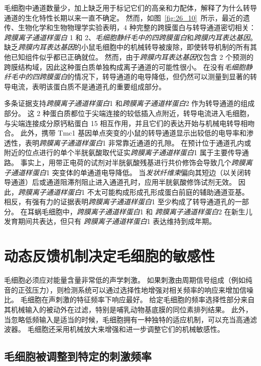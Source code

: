 毛细胞中通道数量少，加上缺乏用于标记它们的高亲和力配体，解释了为什么转导通道的生化特性长期以来一直不确定。
然而，如图~\ref{fig:26_10}~所示，最近的遗传、生物化学和生物物理学实验表明，4 种完整的跨膜蛋白与转导通道密切相关：\textit{跨膜离子通道样蛋白} 1 和 2、\textit{毛细胞静纤毛中的四跨膜蛋白}和\textit{跨膜内耳表达基因}。
缺乏\textit{跨膜内耳表达基因}的小鼠毛细胞中的机械转导被废除，即使转导机制的所有其他已知组件似乎都已正确就位。
然而，由于\textit{跨膜内耳表达基因}仅包含 2 个预测的跨膜结构域，因此这种蛋白质单独构成离子通道的可能性很小。
在没有\textit{毛细胞静纤毛中的四跨膜蛋白}的情况下，转导通道的电导降低，但仍然可以测量到显著的转导电流，表明该蛋白质不是通道孔的重要组成部分。


多条证据支持\textit{跨膜离子通道样蛋白}1 和\textit{跨膜离子通道样蛋白}2 作为转导通道的组成部分。
这 2 种蛋白质都位于尖端连接的较低插入点附近，转导电流进入毛细胞，与尖端连接成分原钙粘蛋白 15 相互作用，并且它们的表达开始与机械电转导相吻合。
此外，携带 Tmc1 基因单点突变的小鼠的转导通道显示出较低的电导率和渗透性，表明\textit{跨膜离子通道样蛋白}1 非常靠近通道的孔隙。
在预计位于通道孔内或附近的位点进行的单个半胱氨酸取代证实\textit{跨膜离子通道样蛋白}1 属于主要传导通路。
事实上，用带正电荷的试剂对半胱氨酸残基进行共价修饰会导致几个\textit{跨膜离子通道样蛋白}1 突变体的单通道电导降低。
当\textit{发状纤维束}偏向其短边（以关闭转导通道）后或通道阻滞剂阻止进入通道孔时，应用半胱氨酸修饰试剂无效。
因此，\textit{跨膜离子通道样蛋白}1 不太可能构成形成孔形成蛋白前庭的辅助通道亚基。
相反，有强有力的证据表明\textit{跨膜离子通道样蛋白}1 至少构成了转导通道孔的一部分。
在耳蜗毛细胞中，\textit{跨膜离子通道样蛋白}1 和 \textit{跨膜离子通道样蛋白}2 在新生儿发育期间共表达，但只有 \textit{跨膜离子通道样蛋白}1 表达维持到成年期。



\section{动态反馈机制决定毛细胞的敏感性}

毛细胞必须应对能量含量非常低的声学刺激。
如果刺激由周期信号组成（例如纯音的正弦压力），则检测系统可以通过选择性地增强对相关频率的响应来增加信噪比。
毛细胞在声刺激的特征频率下响应最好。
给定毛细胞的频率选择性部分来自其机械输入的被动外在过滤，特别是哺乳动物基底膜的同位素排列结果。
此外，当忽略低频输入是适当的时候，毛细胞拥有一种独特的适应机制，可以充当高通滤波器。
毛细胞还采用机械放大来增强和进一步调整它们的机械敏感性。



\subsection{毛细胞被调整到特定的刺激频率}

